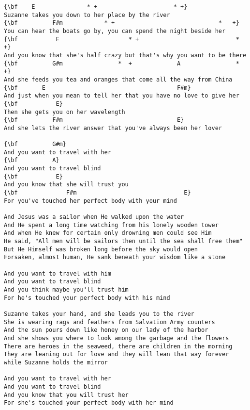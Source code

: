 \documentclass[a4paper]{article}
\begin{document}
\begin{Verbatim}[commandchars=\\\{\}]
{\bf    E               * +                      * +}
Suzanne takes you down to her place by the river
{\bf          F#m            * +                              *   +}
You can hear the boats go by, you can spend the night beside her
{\bf           E                    * +                            *    +}
And you know that she's half crazy but that's why you want to be there
{\bf          G#m                *  +             A                * +}
And she feeds you tea and oranges that come all the way from China
{\bf       E                                      F#m}
And just when you mean to tell her that you have no love to give her
{\bf           E}
Then she gets you on her wavelength
{\bf          F#m                                 E}
And she lets the river answer that you've always been her lover

{\bf          G#m}
And you want to travel with her
{\bf          A}
And you want to travel blind
{\bf           E}
And you know that she will trust you
{\bf              F#m                               E}
For you've touched her perfect body with your mind 

And Jesus was a sailor when He walked upon the water 
And He spent a long time watching from his lonely wooden tower
And when He knew for certain only drowning men could see Him 
He said, "All men will be sailors then until the sea shall free them"
But He Himself was broken long before the sky would open
Forsaken, almost human, He sank beneath your wisdom like a stone 

And you want to travel with him
And you want to travel blind
And you think maybe you'll trust him
For he's touched your perfect body with his mind 

Suzanne takes your hand, and she leads you to the river   
She is wearing rags and feathers from Salvation Army counters
And the sun pours down like honey on our lady of the harbor 
And she shows you where to look among the garbage and the flowers
There are heroes in the seaweed, there are children in the morning    
They are leaning out for love and they will lean that way forever   
while Suzanne holds the mirror 

And you want to travel with her
And you want to travel blind
And you know that you will trust her
For she's touched your perfect body with her mind
\end{Verbatim}
\newpage
\end{document}
